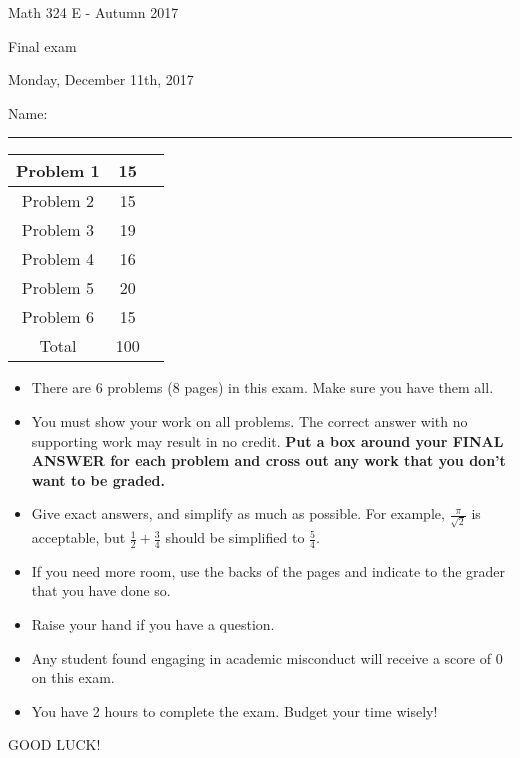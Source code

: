 \documentclass[12 pt]{report}
\begin{document}
\noindent \vfill \noindent \large

\centerline{Math 324 E  - Autumn 2017}

\centerline{Final exam}

\centerline{Monday, December 11th, 2017}

\normalsize

\vfill
\medskip
Name: \rule{10cm}{1pt}

\bigskip

\vfill
\begin{center}
{\large
\begin{tabular}{||c|c|r||}
\hline Problem 1 & 15 & \hspace{10mm} \hfill \\
\hline Problem 2 & 15 & \hspace{10mm} \hfill \\
\hline Problem 3 & 19 & \hspace{10mm} \hfill \\
\hline Problem 4 & 16  & \hspace{10mm} \hfill \\
\hline Problem 5 & 20  & \hspace{10mm} \hfill \\
\hline Problem 6 &  15 & \hspace{10mm} \hfill \\
\hline Total & 100 & \hspace{10mm} \hfill \\
\hline
\end{tabular}
}
\end{center}
\vfill
\begin{itemize}
\item There are 6 problems (8 pages) in this exam. Make sure you have them all. 
\item You must show your work on all problems.  The correct answer
with no supporting work may result in no credit. \textbf{Put a box
around your FINAL ANSWER for each problem and cross out any work
that you don't want to be graded.} 
\item Give exact answers, and simplify as much as possible. 
For example, $\frac{\pi}{\sqrt{2}}$ is acceptable, but $\frac{1}{2} + \frac{3}{4}$
should be simplified to $\frac{5}{4}$.   

\item If you need more room, use the backs
of the pages and indicate to the grader that you have done so.
\item Raise your hand if you have a question.
\item Any student found engaging in academic misconduct will receive
a score of 0 on this exam.
\item You have 2 hours to complete the exam.  Budget your time wisely! \\
\end{itemize}
\vfill
\begin{center}GOOD LUCK!\end{center}
\end{document}
